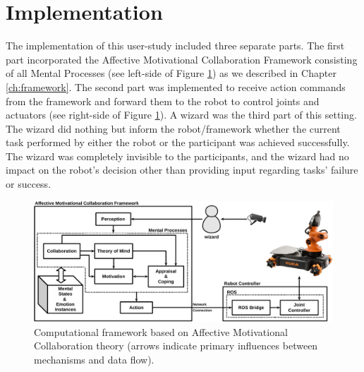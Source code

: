 \documentclass[12pt]{report}
\begin{document}
% 
% 
% 
% 
\section{Implementation}
The implementation of this user-study included three separate parts. The first
part incorporated the Affective Motivational Collaboration Framework consisting
of all Mental Processes (see left-side of Figure \ref{fig:framework}) as we
described in Chapter \ref{ch:framework}. The second part was implemented to
receive action commands from the framework and forward them to the robot to
control joints and actuators (see right-side of Figure \ref{fig:framework}).
A wizard was the third part of this setting. The wizard did nothing but inform
the robot/framework whether the current task performed by either the robot or
the participant was achieved successfully. The wizard was completely invisible
to the participants, and the wizard had no impact on the robot's decision other
than providing input regarding tasks' failure or success.

\begin{figure}[tbh]
  \centering
  \includegraphics[width=\textwidth]{figure/framework-croped.pdf}
  \caption{\fontsize{10}{10}\selectfont Computational framework based on
  Affective Motivational Collaboration theory (arrows indicate primary
  influences between mechanisms and data flow).}
  \label{fig:framework}
\end{figure}
\end{document}
